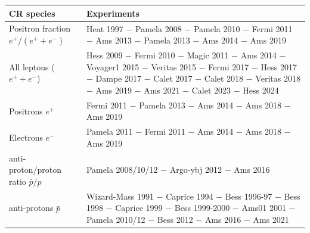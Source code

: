 \begin{table}
\setlength\tabcolsep{10pt} \renewcommand{\arraystretch}{1.6}
\scriptsize{
\begin{center}
\begin{tabular}{|p{}|p{}|}
\hline
{\bf CR species} & {\bf Experiments}  \\
\hline
\hline
Positron fraction \newline $e^+/(e^++e^-)$  & {\sc Heat} 1997 \cite{Barwick:1997ig} $-$ {\sc Pamela} 2008 \cite{Adriani:2008zr} $-$ {\sc Pamela} 2010 \cite{Adriani:2010ib} $-$ {\sc Fermi} 2011 \cite{FermiLAT:2011ab}  $-$ {\sc Ams} 2013 \cite{AMSpositrons2013} $-$ {\sc Pamela} 2013 \cite{Adriani:2013uda} $-$ {\sc Ams} 2014 \cite{AMSpositrons2014} $-$ {\sc Ams} 2019 \cite{AMSele2019} \\
\hline
All leptons \newline ($e^++e^-$)        &  {\sc Hess} 2009 \cite{HESSleptons} $-$ {\sc Fermi} 2010 \cite{FERMIleptons} $-$ {\sc Magic} 2011 \cite{BorlaTridon:2011dk} $-$ {\sc Ams} 2014 \cite{Aguilar:2014fea} $-$ {\sc Voyager1} 2015 \cite{Voyagerepem} $-$ {\sc Veritas} 2015 \cite{Staszak:2015kza} $-$ {\sc Fermi} 2017 \cite{Abdollahi:2017nat} $-$ {\sc Hess} 2017 \cite{HESSleptons2017prelim} $-$ {\sc Dampe} 2017 \cite{DAMPEepem} $-$ {\sc Calet} 2017 \cite{CALETepem} $-$ {\sc Calet} 2018 \cite{Adriani:2018ktz} $-$ {\sc Veritas} 2018 \cite{VERITAS:2018iqb} $-$ {\sc Ams} 2019 \cite{AMSele2019} $-$ {\sc Ams} 2021 \cite{Aguilar:2021tos} $-$ {\sc Calet} 2023 \cite{CALET:2023emo}  $-$ {\sc Hess} 2024 \cite{HESS:2024etj}  \\ 
\hline
Positrons \newline $e^+$ 		&  {\sc Fermi} 2011 \cite{FermiLAT:2011ab} $-$  {\sc Pamela} 2013 \cite{Adriani:2013uda} $-$ {\sc Ams} 2014 \cite{AMSepem2014} $-$  {\sc Ams} 2018 \cite{Aguilar:2018ons} $-$ {\sc Ams} 2019 \cite{AMSpos2019} \\
\hline
Electrons \newline $e^-$		& {\sc Pamela} 2011 \cite{Adriani:2011xv} $-$ {\sc Fermi} 2011 \cite{FermiLAT:2011ab} $-$ {\sc Ams} 2014 \cite{AMSepem2014} $-$  {\sc Ams} 2018 \cite{Aguilar:2018ons} $-$  {\sc Ams} 2019 \cite{AMSele2019} \\
\hline
anti-proton/proton ratio \newline $\bar p/p$ & {\sc Pamela} 2008/10/12 \cite{PAMELApbar} $-$ {\sc Argo-ybj} 2012 \cite{Bartoli:2012qe}  $-$  {\sc Ams} 2016 \cite{Aguilar:2016kjl} \\ 
\hline
anti-protons \newline $\bar p$ 		& {\sc Wizard-Mass} 1991 \cite{Basini:1999hh} $-$ {\sc Caprice} 1994 \cite{Boezio:1997ec} $-$ {\sc Bess} 1996-97 \cite{Orito:1999re} $-$ {\sc Bess} 1998 \cite{Maeno:2000qx} $-$  {\sc Caprice} 1999 \cite{Boezio:2001ac} $-$ {\sc Bess} 1999-2000 \cite{Asaoka:2001fv} $-$ {\sc Ams01} 2001 \cite{Aguilar:2002ad} $-$ {\sc Pamela} 2010/12 \cite{PAMELApbar} $-$ {\sc Bess} 2012 \cite{Abe:2011nx} $-$ {\sc Ams} 2016 \cite{Aguilar:2016kjl} $-$ {\sc Ams} 2021 \cite{Aguilar:2021tos} \\

\end{tabular}
\end{center}}
\end{table}
